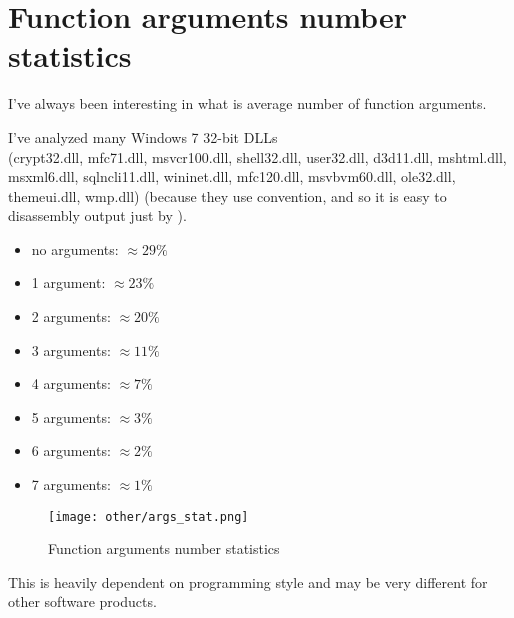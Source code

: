 \section{Function arguments number statistics}
\label{args_stat}

I've always been interesting in what is average number of function arguments.

I've analyzed many Windows 7 32-bit DLLs \\
(crypt32.dll, mfc71.dll, msvcr100.dll, shell32.dll, 
user32.dll, d3d11.dll, mshtml.dll, msxml6.dll, sqlncli11.dll, wininet.dll, mfc120.dll, msvbvm60.dll, ole32.dll, themeui.dll, wmp.dll) 
(because they use  convention, and so it is easy to  disassembly output just by ).

\begin{itemize}
\item no arguments: $\approx 29\%$
\item 1 argument: $\approx 23\%$
\item 2 arguments: $\approx 20\%$
\item 3 arguments: $\approx 11\%$
\item 4 arguments: $\approx 7\%$
\item 5 arguments: $\approx 3\%$
\item 6 arguments: $\approx 2\%$
\item 7 arguments: $\approx 1\%$
\end{itemize}

\begin{figure}[H]
\centering
\texttt{[image: other/args\_stat.png]}
\caption{Function arguments number statistics}
\end{figure}

This is heavily dependent on programming style and may be very different for other software products.

